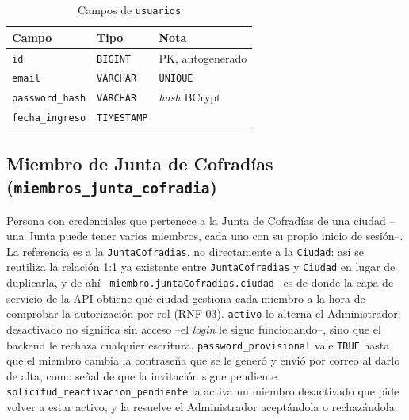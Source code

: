 \begin{table}[H]
\centering
\begin{tabular}{|l|l|p{7cm}|}
\hline
\textbf{Campo} & \textbf{Tipo} & \textbf{Nota} \\
\hline
\texttt{id} & \texttt{BIGINT} & PK, autogenerado \\
\hline
\texttt{email} & \texttt{VARCHAR} & \texttt{UNIQUE} \\
\hline
\texttt{password\_hash} & \texttt{VARCHAR} & \emph{hash} BCrypt \\
\hline
\texttt{fecha\_ingreso} & \texttt{TIMESTAMP} &  \\
\hline
\end{tabular}
\caption{Campos de \texttt{usuarios}}
\end{table}

\subsection{Miembro de Junta de Cofradías (\texttt{miembros\_junta\_cofradia})}
Persona con credenciales que pertenece a la Junta de Cofradías de una ciudad --una Junta puede tener varios miembros, cada uno con su propio inicio de sesión--. La referencia es a la \texttt{JuntaCofradias}, no directamente a la \texttt{Ciudad}: así se reutiliza la relación 1:1 ya existente entre \texttt{JuntaCofradias} y \texttt{Ciudad} en lugar de duplicarla, y de ahí --\texttt{miembro.juntaCofradias.ciudad}-- es de donde la capa de servicio de la API obtiene qué ciudad gestiona cada miembro a la hora de comprobar la autorización por rol (RNF-03). \texttt{activo} lo alterna el Administrador: desactivado no significa sin acceso --el \emph{login} le sigue funcionando--, sino que el backend le rechaza cualquier escritura. \texttt{password\_provisional} vale \texttt{TRUE} hasta que el miembro cambia la contraseña que se le generó y envió por correo al darlo de alta, como señal de que la invitación sigue pendiente. \texttt{solicitud\_reactivacion\_pendiente} la activa un miembro desactivado que pide volver a estar activo, y la resuelve el Administrador aceptándola o rechazándola.

